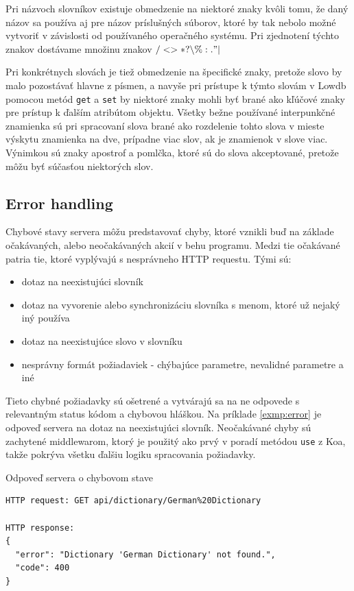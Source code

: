 \documentclass[
  digital, %
  table,   %
  lof,     %
  lot,     %
]{fithesis3}
\begin{document}
Pri názvoch slovníkov existuje obmedzenie na niektoré znaky kvôli tomu, že daný názov sa používa aj pre názov príslušných súborov, ktoré by tak nebolo možné vytvoriť v závislosti od používaného operačného systému. Pri zjednotení týchto znakov dostávame množinu znakov $\slash < > * ? \backslash \% : . "  \vert$

Pri konkrétnych slovách je tiež obmedzenie na špecifické znaky, pretože slovo by malo pozostávať hlavne z písmen, a navyše pri prístupe k týmto slovám v Lowdb pomocou metód \texttt{get} a \texttt{set} by niektoré znaky mohli byť brané ako kľúčové znaky pre prístup k ďalším atribútom objektu. Všetky bežne používané interpunkčné znamienka sú pri spracovaní slova brané ako rozdelenie tohto slova v mieste výskytu znamienka na dve, prípadne viac slov, ak je znamienok v slove viac. Výnimkou sú znaky apostrof a pomlčka, ktoré sú do slova akceptované, pretože môžu byť súčasťou niektorých slov. 

\subsection{Error handling}
Chybové stavy servera môžu predstavovať chyby, ktoré vznikli buď na základe očakávaných, alebo neočakávaných akcií v behu programu. Medzi tie očakávané patria tie, ktoré vyplývajú s nesprávneho HTTP requestu. Tými sú:
\begin{itemize}
\item dotaz na neexistujúci slovník
\item dotaz na vyvorenie alebo synchronizáciu slovníka s menom, ktoré už nejaký iný používa
\item dotaz na neexistujúce slovo v slovníku
\item nesprávny formát požiadaviek - chýbajúce parametre, nevalidné parametre a iné
\end{itemize}

Tieto chybné požiadavky sú ošetrené a vytvárajú sa na ne odpovede s relevantným status kódom a chybovou hláškou. Na príklade \ref{exmp:error} je odpoveď servera na dotaz na neexistujúci slovník. Neočakávané chyby sú zachytené middlewarom, ktorý je použitý ako prvý v poradí metódou \texttt{use} z Koa, takže pokrýva všetku ďalšiu logiku spracovania požiadavky.

\begin{exmp}
\label{exmp:error}
Odpoveď servera o chybovom stave
\centering
\begin{lstlisting}[basicstyle=\small]
HTTP request: GET api/dictionary/German%20Dictionary

HTTP response:
{
  "error": "Dictionary 'German Dictionary' not found.",
  "code": 400
}
\end{lstlisting}
\end{exmp}
\end{document}
